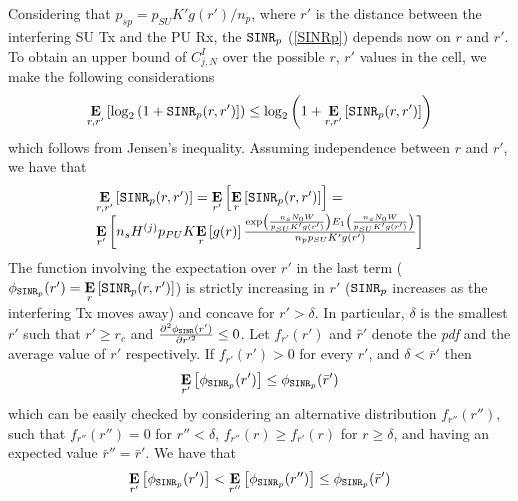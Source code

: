 Considering that $p_{sp}=p_{SU}K'g(r')/n_{p}$, where $r'$ is the distance between the interfering SU Tx and the PU Rx, the $\text{\ttfamily{SINR}}_{p}$ (\ref{SINRp}) depends now on $r$ and $r'$. To obtain an upper bound of $C^{I}_{j,N}$ over the possible $r$, $r'$ values in the cell, we make the following considerations
\begin{equation}
\underset{r,r'}{\mathbf{E}}\left[\text{log}_{2}\left(1+\text{\ttfamily{SINR}}_{p}(r,r')\right]\right) \leq \\
\text{log}_{2}\left(1+\underset{r,r'}{\mathbf{E}}\left[\text{\ttfamily{SINR}}_{p}(r,r')\right]\right)
\end{equation}
which follows from Jensen's inequality. Assuming independence between $r$ and $r'$, we have that
\begin{equation}\label{E_SINRp}
\begin{array}{l}
\underset{r,r'}{\mathbf{E}}\left[\text{\ttfamily{SINR}}_{p}(r,r')\right] = \underset{r'}{\mathbf{E}}\left[\underset{r}{\mathbf{E}}\left[\text{\ttfamily{SINR}}_{p}(r,r')\right]\right] =\\
\underset{r'}{\mathbf{E}}\left[n_{s}H^{(j)}p_{PU}K\underset{r}{\mathbf{E}}\left[g(r)\right]
\frac{\text{exp}\left(\frac{n_{s}N_{0}W}{p_{SU}K'g(r')}\right) E_{1}\left(\frac{n_{s}N_{0}W}{p_{SU}K'g(r')}\right)}{n_{p}p_{SU}K'g(r')}\right]
\end{array}
\end{equation}
The function involving the expectation over $r'$ in the last term ($\phi_{\text{\ttfamily{SINR}}_{p}}(r') = \underset{r}{\mathbf{E}}\left[\text{\ttfamily{SINR}}_{p}(r,r')\right]$) is strictly increasing in $r'$ ($\text{\ttfamily{SINR}}_{p}$ increases as the interfering Tx moves away) and concave for $r'>\delta$.
In particular, $\delta$ is the smallest $r'$ such that $r' \geq r_{c}$ and $\frac{\partial^{2}\phi_\text{\ttfamily{SINR}}(r')}{\partial r'^{2}} \leq 0$.
Let $f_{r'}(r')$ and $\bar{r}'$ denote the \textit{pdf} and the average value of $r'$ respectively. 
If $f_{r'}(r')>0$ for every $r'$, and $\delta<\bar{r}'$ then
\begin{equation}
\underset{r'}{\mathbf{E}}\left[\phi_{\text{\ttfamily{SINR}}_{p}}(r')\right] \leq
\phi_{\text{\ttfamily{SINR}}_{p}}(\bar{r}')
\end{equation}
which can be easily checked by considering an alternative distribution $f_{r''}(r'')$, such that $f_{r''}(r'')=0$ for $r''<\delta$, $f_{r''}(r)\geq f_{r'}(r)$ for $r\geq\delta$, and having an expected value $\bar{r}''=\bar{r}'$. We have that
\begin{equation}
\underset{r'}{\mathbf{E}}\left[\phi_{\text{\ttfamily{SINR}}_{p}}(r')\right] < \underset{r''}{\mathbf{E}}\left[\phi_{\text{\ttfamily{SINR}}_{p}}(r'')\right]
\leq \phi_{\text{\ttfamily{SINR}}_{p}}(\bar{r}')
\end{equation}
